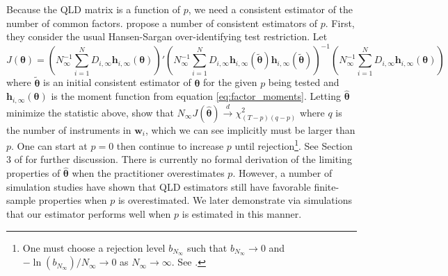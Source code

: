 \documentclass[12pt]{article}
\begin{document}
Because the QLD matrix is a function of $p$, we need a consistent estimator of the number of common factors. \citet{Ahn_Lee_Schmidt_2013} propose a number of consistent estimators of $p$. First, they consider the usual Hansen-Sargan over-identifying test restriction. Let
\begin{equation}
    J(\bm \theta) = \left( N_{\infty}^{-1} \sum_{i = 1}^N D_{i,\infty} \bm h_{i,\infty}(\bm \theta) \right)' \left( N_{\infty}^{-1} \sum_{i = 1}^N D_{i,\infty} \bm h_{i,\infty}(\tilde{\bm \theta}) \bm h_{i,\infty}(\tilde{\bm \theta}) \right)^{-1} \left( N^{-1}_{\infty} \sum_{i = 1}^N D_{i,\infty} \bm h_{i,\infty}(\bm \theta) \right)
\end{equation}
where $\tilde{\bm \theta}$ is an initial consistent estimator of $\bm \theta$ for the given $p$ being tested and $\bm h_{i,\infty}(\bm \theta)$ is the moment function from equation \eqref{eq:factor_moments}. Letting $\widehat{\bm \theta}$ minimize the statistic above, \citet{Ahn_Lee_Schmidt_2013} show that $N_{\infty} J(\widehat{\bm \theta}) \stackrel{d}{\rightarrow} \chi^2_{(T-p)(q-p)}$ 
where $q$ is the number of instruments in $\bm w_i$, which we can see implicitly must be larger than $p$. One can start at $p = 0$ then continue to increase $p$ until rejection\footnote{One must choose a rejection level $b_{N_{\infty}}$ such that $b_{N_\infty} \rightarrow 0$ and $-\ln(b_{N_{\infty}}) / N_\infty \rightarrow 0$ as $N_{\infty} \rightarrow \infty$. See \citet{Cragg_Donald_1997inferring}.}. See Section 3 of \citet{Ahn_Lee_Schmidt_2013} for further discussion. There is currently no formal derivation of the limiting properties of $\widehat{\bm \theta}$ when the practitioner overestimates $p$. However, a number of simulation studies \citep{Ahn_Lee_Schmidt_2013,Breitung_Hansen_2021,Brown_2022} have shown that QLD estimators still have favorable finite-sample properties when $p$ is overestimated. We later demonstrate via simulations that our estimator performs well when $p$ is estimated in this manner. 
\end{document}
